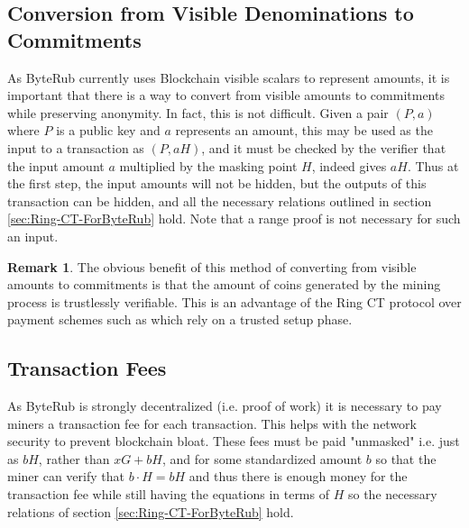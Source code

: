 \documentclass[12pt,english]{mrl}
\theoremstyle{definition}
\newtheorem{rem}[lem]{Remark}
\numberwithin{equation}{section}
\numberwithin{figure}{section}
\numberwithin{equation}{section}
\numberwithin{equation}{section}
\numberwithin{figure}{section}
\begin{document}
\subsection{Conversion from Visible Denominations to Commitments}
\label{conversion}

As ByteRub currently uses Blockchain visible scalars to represent amounts, it is important that there is a way to convert from visible amounts to commitments while preserving anonymity. In fact, this is not difficult. Given a pair $(P, a)$ where $P$ is a public key and $a$ represents an amount, this may be used as the input to a transaction as $(P, aH)$, and it must be checked by the verifier that the input amount $a$ multiplied by the masking point $H$, indeed gives $aH$. Thus at the first step, the input amounts will not be hidden, but the outputs of this transaction can be hidden, and all the necessary relations outlined in section \ref{sec:Ring-CT-ForByteRub} hold. Note that a range proof is not necessary for such an input.
\begin{rem}
The obvious benefit of this method of converting from visible amounts to commitments is that the amount of coins generated by the mining process is trustlessly verifiable. This is an advantage of the Ring CT protocol over payment schemes such as \cite{Z} which rely on a trusted setup phase. 
\end{rem}
\subsection{Transaction Fees}
As ByteRub is strongly decentralized (i.e. proof of work) it is necessary to pay miners a transaction fee for each transaction. This helps with the network security to prevent blockchain bloat. These fees must be paid "unmasked" i.e. just as $bH$, rather than $xG+bH$, and for some standardized amount $b$ so that the miner can verify that $b\cdot H = bH$ and thus there is enough money for the transaction fee while still having the equations in terms of $H$ so the necessary relations of section \ref{sec:Ring-CT-ForByteRub} hold. 
\end{document}

